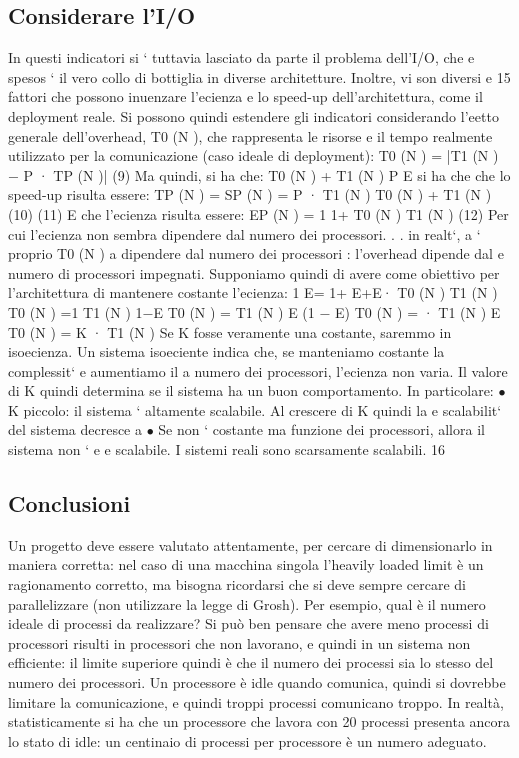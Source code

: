 \documentclass[a4paper,12pt]{article}
\begin{document}
\subsection{Considerare l'I/O}
In questi indicatori si ` tuttavia lasciato da parte il problema dell'I/O, che
e
spesos ` il vero collo di bottiglia in diverse architetture. Inoltre, vi son diversi
e
15
fattori che possono inuenzare l'ecienza e lo speed-up dell'architettura, come
il deployment reale. Si possono quindi estendere gli indicatori considerando
l'eetto generale dell'overhead, T0 (N ), che rappresenta le risorse e il tempo
realmente utilizzato per la comunicazione (caso ideale di deployment):
T0 (N ) = |T1 (N ) $-$ P · TP (N )|
(9)
Ma quindi, si ha che:
T0 (N ) + T1 (N )
P
E si ha che che lo speed-up risulta essere:
TP (N ) =
SP (N ) =
P · T1 (N )
T0 (N ) + T1 (N )
(10)
(11)
E che l'ecienza risulta essere:
EP (N ) =
1
1+
T0 (N )
T1 (N )
(12)
Per cui l'ecienza non sembra dipendere dal numero dei processori. . . in realt`,
a
` proprio T0 (N ) a dipendere dal numero dei processori : l'overhead dipende dal
e
numero di processori impegnati.
Supponiamo quindi di avere come obiettivo per l'architettura di mantenere
costante l'ecienza:
1
E=
1+
E+E·
T0 (N )
T1 (N )
T0 (N )
=1
T1 (N )
1$-$E
T0 (N )
=
T1 (N )
E
(1 $-$ E)
T0 (N ) =
· T1 (N )
E
T0 (N ) = K · T1 (N )
Se K fosse veramente una costante, saremmo in isoecienza. Un sistema isoeciente indica che, se manteniamo costante la
complessit` e aumentiamo il
a
numero dei processori, l'ecienza non varia. Il valore di K quindi determina se
il sistema ha un buon comportamento. In particolare:
$\bullet$ K piccolo: il sistema ` altamente scalabile. Al crescere di K quindi la
e
scalabilit` del sistema decresce
a
$\bullet$ Se non ` costante ma funzione dei processori, allora il sistema non `
e
e
scalabile.
I sistemi reali sono scarsamente scalabili.
16
\subsection{Conclusioni}
Un progetto deve essere valutato attentamente, per cercare di dimensionarlo in maniera corretta: nel caso di una
macchina singola l'heavily loaded limit è un ragionamento corretto, ma bisogna ricordarsi che si deve sempre cercare di
parallelizzare (non utilizzare la legge di Grosh). Per esempio, qual è il numero ideale di processi da realizzare? Si
può ben pensare che avere meno processi di processori risulti in processori che non lavorano, e quindi in un sistema 
non efficiente: il limite superiore quindi è che il numero dei processi sia lo stesso del numero dei processori. Un
processore è idle quando comunica, quindi si dovrebbe limitare la comunicazione, e quindi troppi processi comunicano
troppo.
In realtà, statisticamente si ha che un processore che lavora con 20 processi presenta ancora lo stato di idle: un
centinaio di processi per processore è un numero adeguato.
\end{document}
